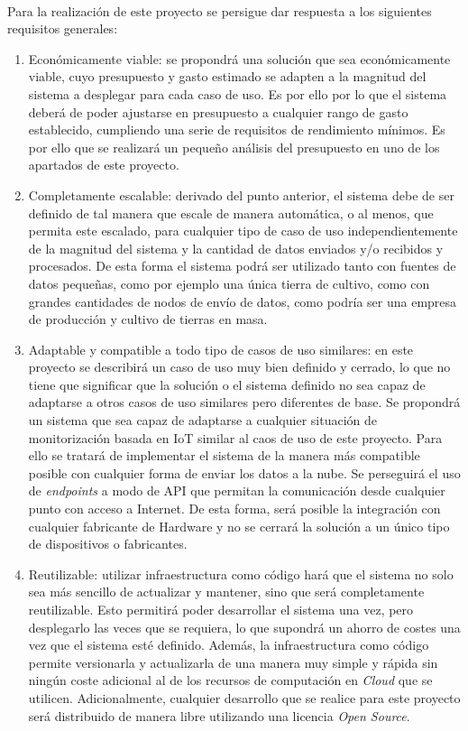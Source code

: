 \documentclass[../../memoria.tex]{subfiles}
\begin{document}
\paragraph{}
Para la realización de este proyecto se persigue dar respuesta a los siguientes requisitos generales:

\begin{enumerate}
    \item Económicamente viable: se propondrá una solución que sea económicamente viable, cuyo presupuesto y gasto estimado se adapten a la magnitud del sistema a desplegar para cada caso de uso. Es por ello por lo que el sistema deberá de poder ajustarse en presupuesto a cualquier rango de gasto establecido, cumpliendo una serie de requisitos de rendimiento mínimos. Es por ello que se realizará un pequeño análisis del presupuesto en uno de los apartados de este proyecto.

    \item Completamente escalable: derivado del punto anterior, el sistema debe de ser definido de tal manera que escale de manera automática, o al menos, que permita este escalado, para cualquier tipo de caso de uso independientemente de la magnitud del sistema y la cantidad de datos enviados y/o recibidos y procesados. De esta forma el sistema podrá ser utilizado tanto con fuentes de datos pequeñas, como por ejemplo una única tierra de cultivo, como con grandes cantidades de nodos de envío de datos, como podría ser una empresa de producción y cultivo de tierras en masa.

    \item Adaptable y compatible a todo tipo de casos de uso similares: en este proyecto se describirá un caso de uso muy bien definido y cerrado, lo que no tiene que significar que la solución o el sistema definido no sea capaz de adaptarse a otros casos de uso similares pero diferentes de base. Se propondrá un sistema que sea capaz de adaptarse a cualquier situación de monitorización basada en IoT similar al caos de uso de este proyecto. Para ello se tratará de implementar el sistema de la manera más compatible posible con cualquier forma de enviar los datos a la nube. Se perseguirá el uso de \textit{endpoints} a modo de API que permitan la comunicación desde cualquier punto con acceso a Internet. De esta forma, será posible la integración con cualquier fabricante de Hardware y no se cerrará la solución a un único tipo de dispositivos o fabricantes.

    \item Reutilizable: utilizar infraestructura como código hará que el sistema no solo sea más sencillo de actualizar y mantener, sino que será completamente reutilizable. Esto permitirá poder desarrollar el sistema una vez, pero desplegarlo las veces que se requiera, lo que supondrá un ahorro de costes una vez que el sistema esté definido. Además, la infraestructura como código permite versionarla y actualizarla de una manera muy simple y rápida sin ningún coste adicional al de los recursos de computación en \textit{Cloud} que se utilicen. Adicionalmente, cualquier desarrollo que se realice para este proyecto será distribuido de manera libre utilizando una licencia \textit{Open Source}.


\end{enumerate}
\end{document}
